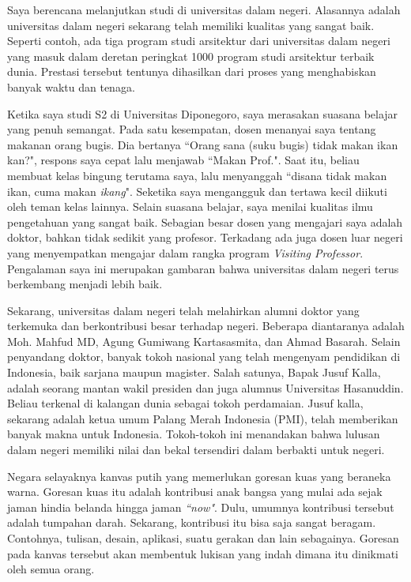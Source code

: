 \documentclass[../main.tex]{subfiles}
\begin{document}
Saya berencana melanjutkan studi di universitas dalam negeri. Alasannya adalah universitas dalam negeri sekarang telah memiliki kualitas yang sangat baik. Seperti contoh, ada tiga program studi arsitektur dari universitas dalam negeri yang masuk dalam deretan peringkat 1000 program studi arsitektur terbaik dunia. Prestasi tersebut tentunya dihasilkan dari proses yang menghabiskan banyak waktu dan tenaga.

Ketika saya studi S2 di Universitas Diponegoro, saya merasakan suasana belajar yang penuh semangat. Pada satu kesempatan, dosen menanyai saya tentang makanan orang bugis. Dia bertanya ``Orang sana (suku bugis) tidak makan ikan kan?", respons saya cepat lalu menjawab ``Makan Prof.". Saat itu, beliau membuat kelas bingung terutama saya, lalu menyanggah ``disana tidak makan ikan, cuma makan \textit{ikang}".
Seketika saya mengangguk dan tertawa kecil diikuti oleh teman kelas lainnya. Selain suasana belajar, saya menilai kualitas ilmu pengetahuan yang sangat baik.
Sebagian besar dosen yang mengajari saya adalah doktor, bahkan tidak sedikit yang profesor. Terkadang ada juga dosen luar negeri yang menyempatkan mengajar dalam rangka program \textit{Visiting Professor}. Pengalaman saya ini merupakan gambaran bahwa universitas dalam negeri terus berkembang menjadi lebih baik.

Sekarang, universitas dalam negeri telah melahirkan alumni doktor yang terkemuka dan berkontribusi besar terhadap negeri.
Beberapa diantaranya adalah Moh. Mahfud MD, Agung Gumiwang Kartasasmita, dan Ahmad Basarah. Selain penyandang doktor, banyak tokoh nasional yang telah mengenyam pendidikan di Indonesia, baik sarjana maupun magister. Salah satunya, Bapak Jusuf Kalla, adalah seorang mantan wakil presiden dan juga alumnus Universitas Hasanuddin. Beliau terkenal di kalangan dunia sebagai tokoh perdamaian. Jusuf kalla, sekarang adalah ketua umum Palang Merah Indonesia (PMI), telah memberikan banyak makna untuk Indonesia.
Tokoh-tokoh ini menandakan bahwa lulusan dalam negeri memiliki nilai dan bekal tersendiri dalam berbakti untuk negeri.

Negara selayaknya kanvas putih yang memerlukan goresan kuas yang beraneka warna. Goresan kuas itu adalah kontribusi anak bangsa yang mulai ada sejak jaman hindia belanda hingga jaman \textit{``now"}. Dulu, umumnya kontribusi tersebut adalah tumpahan darah. Sekarang, kontribusi itu bisa saja sangat beragam. Contohnya, tulisan, desain, aplikasi, suatu gerakan dan lain sebagainya. Goresan pada kanvas tersebut akan membentuk lukisan yang indah dimana itu dinikmati oleh semua orang. %
\end{document}
